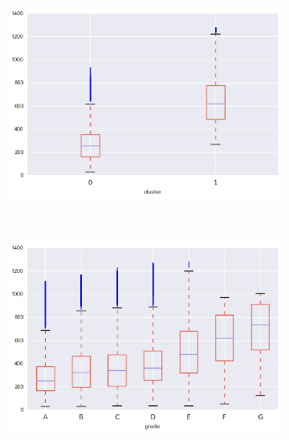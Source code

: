 \begin{apendicesenv}
\begin{figure}[t!]
\begin{subfigure}[t]{0.5\textwidth}
			\centerline{\includegraphics[width=1.05\textwidth]{img/installment_by_cluster}}
    	\end{subfigure}%
    	~ 
    	\begin{subfigure}[t]{0.5\textwidth}
    		\centering
   
			\centerline{\includegraphics[width=1.05\textwidth]{img/installment_by_grade}}

    	\end{subfigure}



\end{figure}

\begin{figure}[t!]
    \centering
        \caption{term\textunderscore float\textunderscore fee }
    	\begin{subfigure}[t]{0.5\textwidth}
    		\centering


\end{subfigure}
\end{figure}
\end{apendicesenv}
